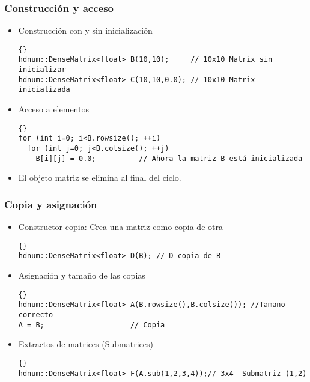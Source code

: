 \begin{frame}[fragile]
\frametitle{Construcción y acceso}
\begin{itemize}
\item Construcción con y sin inicialización \\
{\footnotesize{\begin{lstlisting}{}
hdnum::DenseMatrix<float> B(10,10);     // 10x10 Matrix sin inicializar
hdnum::DenseMatrix<float> C(10,10,0.0); // 10x10 Matrix inicializada
\end{lstlisting}}}
\item Acceso a elementos\\
{\footnotesize{\begin{lstlisting}{}
for (int i=0; i<B.rowsize(); ++i)
  for (int j=0; j<B.colsize(); ++j)
    B[i][j] = 0.0;          // Ahora la matriz B está inicializada
\end{lstlisting}}}
\item El objeto matriz se elimina al final del ciclo.
\end{itemize}
\end{frame}

\begin{frame}[fragile]
\frametitle{Copia y asignación}
\begin{itemize}
\item Constructor copia: Crea una matriz como copia de otra
{\footnotesize{\begin{lstlisting}{}
hdnum::DenseMatrix<float> D(B); // D copia de B
\end{lstlisting}}}
\item Asignación y tamaño de las copias
{\footnotesize{\begin{lstlisting}{}
hdnum::DenseMatrix<float> A(B.rowsize(),B.colsize()); //Tamano correcto
A = B;                    // Copia
\end{lstlisting}}}
\item Extractos de matrices (Submatrices)\\
{\footnotesize{\begin{lstlisting}{}
hdnum::DenseMatrix<float> F(A.sub(1,2,3,4));// 3x4  Submatriz (1,2)
\end{lstlisting}}}
\end{itemize}
\end{frame}


